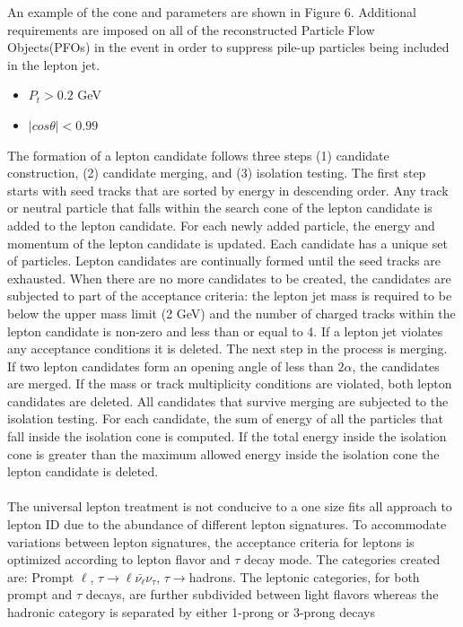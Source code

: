 An example of the cone and parameters are shown in Figure 6. Additional requirements are imposed on all of the reconstructed Particle Flow Objects(PFOs) in the event in order to suppress pile-up particles being included in the lepton jet.
\begin{itemize}
\item $P_t > 0.2$ GeV
\item $|cos\theta| < 0.99$
\end{itemize}
The formation of a lepton candidate follows three steps (1) candidate construction, (2) candidate merging, and (3) isolation testing.
The first step starts with seed tracks that are sorted by energy in descending order. Any track or neutral particle that falls within the search cone of the lepton candidate is added to the lepton candidate. For each newly added particle, the energy and momentum of the lepton candidate is updated. Each candidate has a unique set of particles. Lepton candidates are continually formed until the seed tracks are exhausted. When there are no more candidates to be created, the candidates are subjected to part of the acceptance criteria: the lepton jet mass is required to be below the upper mass limit (2 GeV) and the number of charged tracks within the lepton candidate is non-zero and less than or equal to 4. If a lepton jet violates any acceptance conditions it is deleted. The next step in the process is merging. If two lepton candidates form an opening angle of less than $2\alpha$, the candidates are merged. If the mass or track multiplicity conditions are violated, both lepton candidates are deleted.  All  candidates that survive merging are subjected to the isolation testing. For each candidate, the sum of energy of all the particles that fall inside the isolation cone is computed. If the total energy inside the isolation cone is greater than the maximum allowed energy inside the isolation cone the lepton candidate is deleted.\\
\quad \quad \\
The universal lepton treatment is not conducive to a one size fits all approach to lepton ID due to the abundance of different lepton signatures. To accommodate variations between lepton signatures, the acceptance criteria for leptons is optimized according to lepton flavor and $\tau$ decay mode. The categories created are: Prompt $\ell$, $\tau \rightarrow \ell\bar{\nu_{\ell}} \nu_{\tau}$, $\tau \rightarrow $hadrons. The leptonic categories, for both prompt and $\tau$ decays, are further subdivided between light flavors whereas the hadronic category is separated by either 1-prong or 3-prong decays\\

